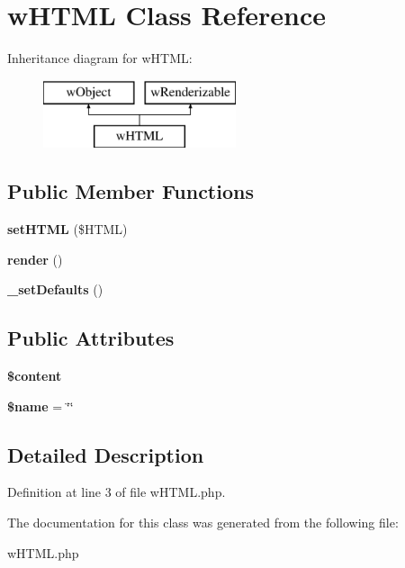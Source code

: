 \hypertarget{classwHTML}{
\section{wHTML Class Reference}
\label{classwHTML}
}
Inheritance diagram for wHTML:\begin{figure}[H]
\begin{center}
\leavevmode
\includegraphics[height=2.000000cm]{classwHTML}
\end{center}
\end{figure}
\subsection*{Public Member Functions}
\begin{DoxyCompactItemize}
\item 
\hypertarget{classwHTML_a75691dde71b4ccdfb73765e5d844e3d3}{
{\bfseries setHTML} (\$HTML)}
\label{classwHTML_a75691dde71b4ccdfb73765e5d844e3d3}

\item 
\hypertarget{classwHTML_a1431f340790d3b3e223ea43849877fd2}{
{\bfseries render} ()}
\label{classwHTML_a1431f340790d3b3e223ea43849877fd2}

\item 
\hypertarget{classwHTML_a10bcae073ee26ce8481c4f990881b1cb}{
{\bfseries \_\-setDefaults} ()}
\label{classwHTML_a10bcae073ee26ce8481c4f990881b1cb}

\end{DoxyCompactItemize}
\subsection*{Public Attributes}
\begin{DoxyCompactItemize}
\item 
\hypertarget{classwHTML_a9b0d0bbdeaa085f9d1daffc942e44fd6}{
{\bfseries \$content}}
\label{classwHTML_a9b0d0bbdeaa085f9d1daffc942e44fd6}

\item 
\hypertarget{classwHTML_a8391ae7c486824428775dfcf9c223c7b}{
{\bfseries \$name} = \char`\"{}\char`\"{}}
\label{classwHTML_a8391ae7c486824428775dfcf9c223c7b}

\end{DoxyCompactItemize}


\subsection{Detailed Description}


Definition at line 3 of file wHTML.php.



The documentation for this class was generated from the following file:\begin{DoxyCompactItemize}
\item 
wHTML.php\end{DoxyCompactItemize}
